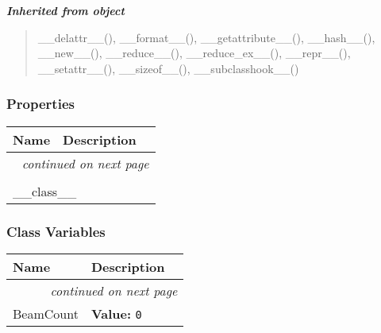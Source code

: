 \large{\textbf{\textit{Inherited from object}}}

\begin{quote}
\_\_delattr\_\_(), \_\_format\_\_(), \_\_getattribute\_\_(), \_\_hash\_\_(), \_\_new\_\_(), \_\_reduce\_\_(), \_\_reduce\_ex\_\_(), \_\_repr\_\_(), \_\_setattr\_\_(), \_\_sizeof\_\_(), \_\_subclasshook\_\_()
\end{quote}


  \subsubsection{Properties}

    \vspace{-1cm}
\hspace{\varindent}\begin{longtable}{|p{\varnamewidth}|p{\vardescrwidth}|l}
\cline{1-2}
\cline{1-2} \centering \textbf{Name} & \centering \textbf{Description}& \\
\cline{1-2}
\endhead\cline{1-2}\multicolumn{3}{r}{\small\textit{continued on next page}}\\\endfoot\cline{1-2}
\endlastfoot\multicolumn{2}{|l|}{\textit{Inherited from object}}\\
\multicolumn{2}{|p{\varwidth}|}{\raggedright \_\_class\_\_}\\
\cline{1-2}
\end{longtable}



  \subsubsection{Class Variables}

    \vspace{-1cm}
\hspace{\varindent}\begin{longtable}{|p{\varnamewidth}|p{\vardescrwidth}|l}
\cline{1-2}
\cline{1-2} \centering \textbf{Name} & \centering \textbf{Description}& \\
\cline{1-2}
\endhead\cline{1-2}\multicolumn{3}{r}{\small\textit{continued on next page}}\\\endfoot\cline{1-2}
\endlastfoot\raggedright B\-e\-a\-m\-C\-o\-u\-n\-t\- & \raggedright \textbf{Value:} 
{\tt 0}&\\
\cline{1-2}
\end{longtable}

